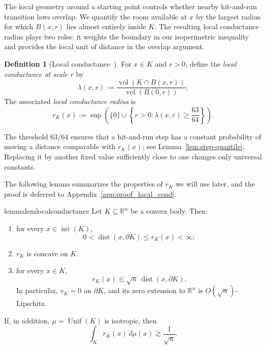 \documentclass[11pt]{article}
\theoremstyle{definition}
\newtheorem{definition}[theorem]{Definition}
\theoremstyle{remark}
\newcommand{\R}{\mathbb R}
\newcommand{\vol}{\operatorname{vol}}
\newcommand{\Unif}{\operatorname{Unif}}
\newcommand{\rK}{r_K}
\begin{document}
The local geometry around a starting point controls whether nearby hit-and-run transition laws overlap. We quantify the room available at \(x\) by the largest radius for which \(B(x,r)\) lies almost entirely inside \(K\). The resulting local conductance radius plays two roles: it weights the boundary in our isoperimetric inequality and provides the local unit of distance in the overlap argument.
\begin{definition}[Local conductance~{\cite{LovaszHR}}]
For \(x\in K\) and \(r>0\), define the \emph{local conductance at scale
\(r\)} by
\begin{equation}\label{eq:occupancy-ratio}
 \lambda(x,r)
 :=
 \frac{\vol(K\cap B(x,r))}{\vol(B(0,r))};
\end{equation}
The associated \emph{local conductance radius} is
\begin{equation}\label{eq:local-radius}
 \rK(x)
 :=
 \sup\left(
 \{0\}\cup
 \left\{r>0:\lambda(x,r)\ge\frac{63}{64}\right\}
 \right).
\end{equation}
\end{definition}
The threshold $63/64$ ensures that a hit-and-run step has a constant probability of moving a distance comparable with $\rK(x)$; see Lemma~\ref{lem:step-quantile}.  Replacing it by another fixed value sufficiently close to one changes only universal constants.

The following lemma summarizes the properties of $\rK$ we will use later, and the proof is deferred to Appendix~\ref{app:proof_local_cond}. 

\begin{restatable}{lemma}{lemlocalconductance}\label{lem:local-radius}
Let \(K\subseteq\R^n\) be a convex body.  Then:
\begin{enumerate}[label=\textup{(\roman*)}]
\item for every $x\in \operatorname{int}(K)$,
\begin{equation}\label{eq:radius-positive-finite}
 0<\operatorname{dist}(x,\partial K)\le \rK(x)<\infty;
\end{equation}
 \item \(\rK\) is concave on \(K\).

 \item for every \(x\in K\),
 \begin{equation}\label{eq:radius-boundary-distance}
  \rK(x)
  \lesssim
  \sqrt n\,\operatorname{dist}(x,\partial K).
 \end{equation}
 In particular, \(\rK=0\) on \(\partial K\), and its zero extension to \(\R^n\) is \(O(\sqrt n)\)-Lipschitz.
\end{enumerate}
If, in addition, $\mu=\Unif(K)$ is isotropic, then
 \begin{equation}\label{eq:mean-local-radius}
  \int_K\rK(x)\,d\mu(x)\gtrsim\frac1{\sqrt n}.
 \end{equation}
\end{restatable}
\end{document}
